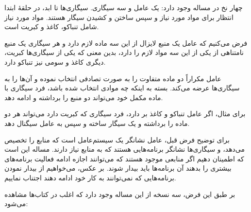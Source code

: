 \documentclass{book}
\begin{document}
    چهار نخ در مساله وجود دارد: یک عامل و سه سیگاری. سیگاری‌ها تا ابد، در حلقهٔ ابتدا انتظار برای مواد مورد نیاز و سپس ساختن و کشیدن سیگار هستند.
    مواد مورد نیاز شامل تنباکو، کاغذ و کبریت است. 

    فرض می‌کنیم که عامل یک منبع لایزال از این سه ماده لازم دارد و هر سیگاری یک منبع نامتناهی از یکی از این سه مواد لازم را دارد، بدین معنی که 
    یکی از سیگاری‌ها کبریت، دیگری کاغذ و سومی نیز تنباکو دارد. 

    عامل مکراراً دو ماده متفاوت را به صورت تصادفی انتخاب نموده و آن‌ها را به سیگاری‌ها عرضه می‌کند. 
    بسته به اینکه چه موادی انتخاب شده باشد، فرد سیگاری با ماده مکمل خود می‌تواند دو منبع را برداشته و ادامه دهد. 

    برای مثال، اگر عامل تنباکو و کاغذ بر دارد، فرد سیگاری که کبریت دارد می‌تواند هر دو ماده را برداشته و یک سیگار ساخته و سپس به عامل سیگنال دهد. 

    برای توضیح فرض قبل،‌    
    عامل نشانگر یک سیستم‌عامل است که منابع را تخصیص می‌دهد، و سیگاری‌ها نشانگر برنامه‌هایی هستند که به منابع نیاز دارند. 
    مساله این است که اطمینان دهیم اگر منابعی موجود هستند که می‌توانند اجازه ادامه فعالیت برنامه‌های بیشتری را بدهند آن برنامه‌ها باید بیدار شوند. 
    بر عکس، می‌خواهیم از بیدار نمودن برنامه‌هایی که نمی‌توانند به کار خود ادامه دهند اجتناب نماییم. 


    بر طبق این فرض، سه نسخه از این مساله وجود دارد که اغلب در کتاب‌ها مشاهده می‌شود: 
\end{document}

